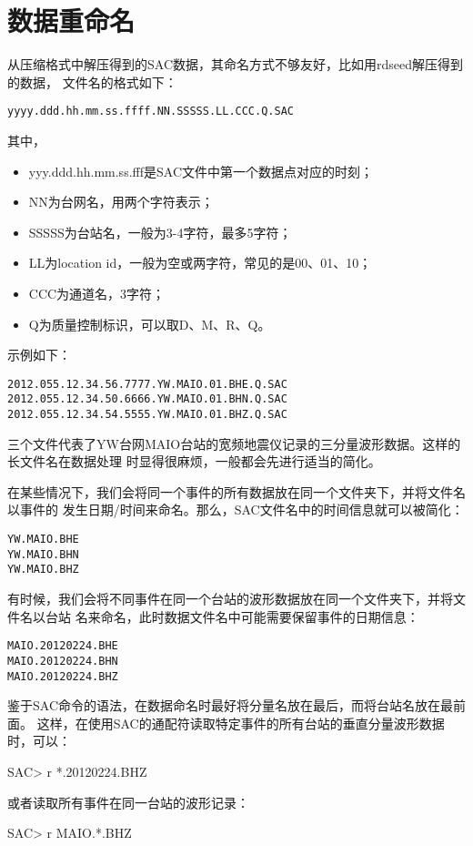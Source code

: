 \section{数据重命名}
从压缩格式中解压得到的SAC数据，其命名方式不够友好，比如用rdseed解压得到的数据，
文件名的格式如下：
\begin{lstlisting}[style=Shell]
yyyy.ddd.hh.mm.ss.ffff.NN.SSSSS.LL.CCC.Q.SAC
\end{lstlisting}
其中，
\begin{itemize}
\item yyy.ddd.hh.mm.ss.fff是SAC文件中第一个数据点对应的时刻；
\item NN为台网名，用两个字符表示；
\item SSSSS为台站名，一般为3-4字符，最多5字符；
\item LL为location id，一般为空或两字符，常见的是00、01、10；
\item CCC为通道名，3字符；
\item Q为质量控制标识，可以取D、M、R、Q。
\end{itemize}

示例如下：
\begin{lstlisting}[style=Bash]
2012.055.12.34.56.7777.YW.MAIO.01.BHE.Q.SAC
2012.055.12.34.50.6666.YW.MAIO.01.BHN.Q.SAC
2012.055.12.34.54.5555.YW.MAIO.01.BHZ.Q.SAC
\end{lstlisting}
三个文件代表了YW台网MAIO台站的宽频地震仪记录的三分量波形数据。这样的长文件名在数据处理
时显得很麻烦，一般都会先进行适当的简化。

在某些情况下，我们会将同一个事件的所有数据放在同一个文件夹下，并将文件名以事件的
发生日期/时间来命名。那么，SAC文件名中的时间信息就可以被简化：
\begin{lstlisting}[style=Bash]
YW.MAIO.BHE
YW.MAIO.BHN
YW.MAIO.BHZ
\end{lstlisting}

有时候，我们会将不同事件在同一个台站的波形数据放在同一个文件夹下，并将文件名以台站
名来命名，此时数据文件名中可能需要保留事件的日期信息：
\begin{lstlisting}[style=Bash]
MAIO.20120224.BHE
MAIO.20120224.BHN
MAIO.20120224.BHZ
\end{lstlisting}

鉴于SAC命令的语法，在数据命名时最好将分量名放在最后，而将台站名放在最前面。
这样，在使用SAC的通配符读取特定事件的所有台站的垂直分量波形数据时，可以：
\begin{SACCode}
SAC> r *.20120224.BHZ
\end{SACCode}
或者读取所有事件在同一台站的波形记录：
\begin{SACCode}
SAC> r MAIO.*.BHZ
\end{SACCode}
